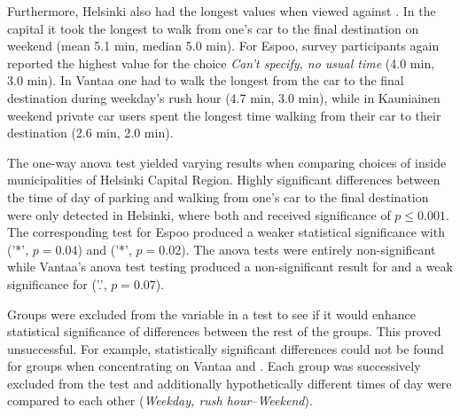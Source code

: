 Furthermore, Helsinki also had the longest  values when viewed against . In the capital it took the longest to walk from one's car to the final destination on weekend (mean 5.1 min, median 5.0 min). For Espoo, survey participants again reported the highest  value for the choice \textit{Can't specify, no usual time} (4.0 min, 3.0 min). In Vantaa one had to walk the longest from the car to the final destination during weekday's rush hour (4.7 min, 3.0 min), while in Kauniainen weekend private car users spent the longest time walking from their car to their destination (2.6 min, 2.0 min).

The one-way \acrshort{anova} test yielded varying results when comparing choices of  inside municipalities of Helsinki Capital Region. Highly significant differences between the time of day of parking and walking from one's car to the final destination were only detected in Helsinki, where both  and  received significance of $p \leq 0.001$. The corresponding test for Espoo produced a weaker statistical significance with  ('*', $p = 0.04$) and  ('*', $p = 0.02$). The \acrshort{anova} tests were entirely non-significant while Vantaa's \acrshort{anova} test testing  produced a non-significant result for  and a weak significance for  ('.', $p = 0.07$).

Groups were excluded from the variable  in a test to see if it would enhance statistical significance of differences between the rest of the groups. This proved unsuccessful. For example, statistically significant differences could not be found for  groups when concentrating on Vantaa and . Each group was successively excluded from the test and additionally hypothetically different times of day were compared to each other (\textit{Weekday, rush hour}--\textit{Weekend}).

